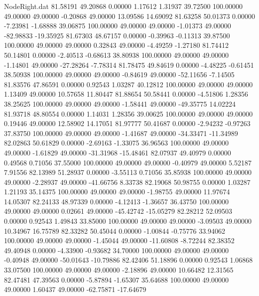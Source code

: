 \begin{filecontents}{NodeRight.dat}
  81.58191   49.20868    0.00000     1.17612    1.31937   39.72500  100.00000   49.00000   49.00000   -0.20868   49.00000   13.09586   14.69092
  81.63258   50.01373    0.00000    -7.23981   -1.68888   39.06875  100.00000   49.00000   49.00000   -1.01373   49.00000  -82.98833  -19.35925
  81.67303   48.67157    0.00000    -0.39963   -0.11313   39.87500  100.00000   49.00000   49.00000    0.32843   49.00000   -4.49259   -1.27180
  81.74412   50.14801    0.00000    -2.40513   -0.68613   38.80938  100.00000   49.00000   49.00000   -1.14801   49.00000  -27.28264   -7.78314
  81.78475   49.84619    0.00000    -4.48225   -0.61451   38.50938  100.00000   49.00000   49.00000   -0.84619   49.00000  -52.11656   -7.14505
  81.83576   47.86591    0.00000     0.92543    1.03287   40.12812  100.00000   49.00000   49.00000    1.13409   49.00000   10.57658   11.80447
  81.88654   50.58441    0.00000    -4.51806    1.28356   38.25625  100.00000   49.00000   49.00000   -1.58441   49.00000  -49.35775   14.02224
  81.93718   48.80554    0.00000     1.14031    1.28356   39.00625  100.00000   49.00000   49.00000    0.19446   49.00000   12.58902   14.17051
  81.97777   50.41687    0.00000    -2.94232   -0.97263   37.83750  100.00000   49.00000   49.00000   -1.41687   49.00000  -34.33471  -11.34989
  82.02863   50.61829    0.00000    -2.69163   -1.33075   36.96563  100.00000   49.00000   49.00000   -1.61829   49.00000  -31.31968  -15.48461
  82.07937   49.40979    0.00000     0.49568    0.71056   37.55000  100.00000   49.00000   49.00000   -0.40979   49.00000    5.52187    7.91556
  82.13989   51.28937    0.00000    -3.55113    0.71056   35.85938  100.00000   49.00000   49.00000   -2.28937   49.00000  -41.66756    8.33738
  82.19068   50.98755    0.00000     1.03287    1.21193   35.14375  100.00000   49.00000   49.00000   -1.98755   49.00000   11.97674   14.05307
  82.24133   48.97339    0.00000    -4.12413   -1.36657   36.43750  100.00000   49.00000   49.00000    0.02661   49.00000  -45.42742  -15.05279
  82.28212   52.09503    0.00000     0.92543    1.49843   33.85000  100.00000   49.00000   49.00000   -3.09503   49.00000   10.34967   16.75789
  82.33282   50.45044    0.00000    -1.00844   -0.75776   33.94062  100.00000   49.00000   49.00000   -1.45044   49.00000  -11.60808   -8.72244
  82.38352   49.40948    0.00000    -4.33900   -0.93682   34.70000  100.00000   49.00000   49.00000   -0.40948   49.00000  -50.01643  -10.79886
  82.42406   51.18896    0.00000     0.92543    1.06868   33.07500  100.00000   49.00000   49.00000   -2.18896   49.00000   10.66482   12.31565
  82.47481   47.39563    0.00000    -5.87894   -1.65307   35.64688  100.00000   49.00000   49.00000    1.60437   49.00000  -62.75871  -17.64679

\end{filecontents}
